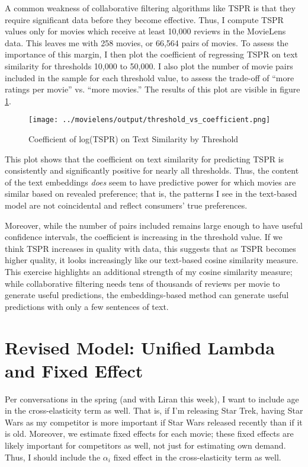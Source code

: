 \documentclass{article}
\begin{document}
A common weakness of collaborative filtering algorithms like TSPR is that they require significant data before they become effective. Thus, I compute TSPR values only for movies which receive at least 10,000 reviews in the MovieLens data. This leaves me with 258 movies, or 66,564 pairs of movies. To assess the importance of this margin, I then plot the coefficient of regressing TSPR on text similarity for thresholds 10,000 to 50,000. I also plot the number of movie pairs included in the sample for each threshold value, to assess the trade-off of ``more ratings per movie'' vs. ``more movies.'' The results of this plot are visible in figure \ref{fig:tspr_threshold}. 

\begin{figure}
    \begin{center}
    \texttt{[image: ../movielens/output/threshold\_vs\_coefficient.png]}
    \caption{Coefficient of log(TSPR) on Text Similarity by Threshold}
    \label{fig:tspr_threshold}
    \end{center}
\end{figure}

This plot shows that the coefficient on text similarity for predicting TSPR is consistently and significantly positive for nearly all thresholds. Thus, the content of the text embeddings \emph{does} seem to have predictive power for which movies are similar based on revealed preference; that is, the patterns I see in the text-based model are not coincidental and reflect consumers' true preferences. 

Moreover, while the number of pairs included remains large enough to have useful confidence intervals, the coefficient is increasing in the threshold value. If we think TSPR increases in quality with data, this suggests that as TSPR becomes higher quality, it looks increasingly like our text-based cosine similarity measure. This exercise highlights an additional strength of my cosine similarity measure; while collaborative filtering needs tens of thousands of reviews per movie to generate useful predictions, the embeddings-based method can generate useful predictions with only a few sentences of text.

\section{Revised Model: Unified Lambda and Fixed Effect}

Per conversations in the spring (and with Liran this week), I want to include age in the cross-elasticity term as well. That is, if I'm releasing Star Trek, having Star Wars as my competitor is more important if Star Wars released recently than if it is old. Moreover, we estimate fixed effects for each movie; these fixed effects are likely important for competitors as well, not just for estimating own demand. Thus, I should include the $\alpha_i$ fixed effect in the cross-elasticity term as well.
\end{document}
